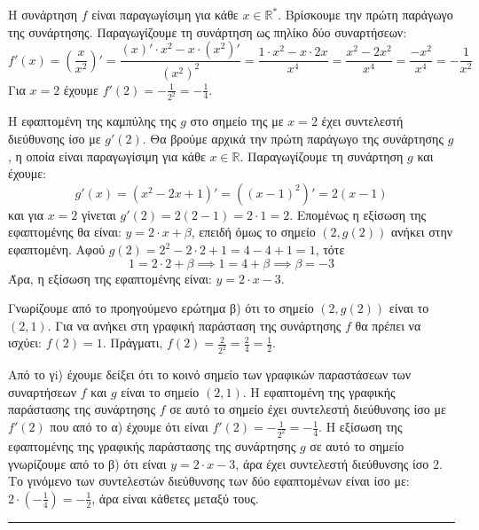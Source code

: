 \begin{alist}
\item Η συνάρτηση $f$ είναι παραγωγίσιμη για κάθε $x \in \mathbb{R}^*$. Βρίσκουμε την πρώτη παράγωγο της συνάρτησης. Παραγωγίζουμε τη συνάρτηση ως πηλίκο δύο συναρτήσεων:
\[ f'(x) = \left( \frac{x}{x^2} \right)' = \frac{(x)' \cdot x^2 - x \cdot (x^2)'}{(x^2)^2} = \frac{1 \cdot x^2 - x \cdot 2x}{x^4} = \frac{x^2 - 2x^2}{x^4} = \frac{-x^2}{x^4} = -\frac{1}{x^2} \]
Για $x=2$ έχουμε $f'(2) = -\frac{1}{2^2} = -\frac{1}{4}$.
\item Η εφαπτομένη της καμπύλης της $g$ στο σημείο της με $x=2$ έχει συντελεστή διεύθυνσης ίσο με $g'(2)$. Θα βρούμε αρχικά την πρώτη παράγωγο της συνάρτησης $g$, η οποία είναι παραγωγίσιμη για κάθε $x \in \mathbb{R}$. Παραγωγίζουμε τη συνάρτηση $g$ και έχουμε:
\[ g'(x) = (x^2 - 2x + 1)' = ((x-1)^2)' = 2(x-1) \]
και για $x=2$ γίνεται $g'(2) = 2(2-1) = 2 \cdot 1 = 2$.
Επομένως η εξίσωση της εφαπτομένης θα είναι: $y = 2 \cdot x + \beta$, επειδή όμως το σημείο $(2, g(2))$ ανήκει στην εφαπτομένη.
Αφού $g(2) = 2^2 - 2 \cdot 2 + 1 = 4 - 4 + 1 = 1$, τότε
\[ 1 = 2 \cdot 2 + \beta \implies 1 = 4 + \beta \implies \beta = -3 \]
Άρα, η εξίσωση της εφαπτομένης είναι: $y = 2 \cdot x - 3$.
\item 
\begin{rlist}
\item Γνωρίζουμε από το προηγούμενο ερώτημα β) ότι το σημείο $(2, g(2))$ είναι το $(2, 1)$. Για να ανήκει στη γραφική παράσταση της συνάρτησης $f$ θα πρέπει να ισχύει: $f(2) = 1$.
Πράγματι, $f(2) = \frac{2}{2^2} = \frac{2}{4} = \frac{1}{2}$.
\item Από το γi) έχουμε δείξει ότι το κοινό σημείο των γραφικών παραστάσεων των συναρτήσεων $f$ και $g$ είναι το σημείο $(2, 1)$.
Η εφαπτομένη της γραφικής παράστασης της συνάρτησης $f$ σε αυτό το σημείο έχει συντελεστή διεύθυνσης ίσο με $f'(2)$ που από το α) έχουμε ότι είναι $f'(2) = -\frac{1}{2^2} = -\frac{1}{4}$.
Η εξίσωση της εφαπτομένης της γραφικής παράστασης της συνάρτησης $g$ σε αυτό το σημείο γνωρίζουμε από το β) ότι είναι $y = 2 \cdot x - 3$, άρα έχει συντελεστή διεύθυνσης ίσο $2$. Το γινόμενο των συντελεστών διεύθυνσης των δύο εφαπτομένων είναι ίσο με: $2 \cdot \left(-\frac{1}{4}\right) = -\frac{1}{2}$, άρα είναι κάθετες μεταξύ τους.
\end{rlist}
\end{alist}
\vspace{6mm}
\noindent\rule{\textwidth}{0.4pt}
\vspace{6mm}

